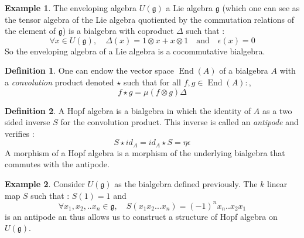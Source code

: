 \documentclass[11pt]{article}
\DeclareMathOperator{\End}{End}
\theoremstyle{definition}
\newtheorem{ex}{Example}[section]
\newtheorem{Def}{Definition}[section]
\begin{document}
\begin{ex} The enveloping algebra $U(\mathfrak{g})$  a Lie algebra $\mathfrak{g}$ (which one can see as the tensor algebra of the Lie algebra quotiented by the commutation relations of the element of $\mathfrak{g}$) is a bialgebra with coproduct $\Delta$ such that : $$\forall x\in U(\mathfrak{g}),\quad\Delta(x)=1\otimes x+ x\otimes 1\quad\mbox{and}\quad \epsilon(x)=0$$
So the enveloping algebra of a Lie algebra is a cocommutative bialgebra.
\end{ex}
\begin{Def} One can endow the vector space $\End(A)$ of a bialgebra $A$ with a \textit{convolution} product denoted $\star$ such that for all $f,g\in\End(A):$, $$f\star g=\mu(f\otimes g)\Delta $$
\end{Def}
\begin{Def} A Hopf algebra is a bialgebra in which the identity of $A$ as a two sided inverse $S$ for the convolution product. This inverse is called an \textit{antipode} and verifies : $$S\star id_A= id_A\star S=\eta\epsilon$$
A morphism of a Hopf algebra is a morphism of the underlying bialgebra that commutes with the antipode.
\end{Def}
\begin{ex}
Consider $U(\mathfrak{g})$ as the bialgebra defined previously. The $k$ linear map $S$ such that : $S(1)=1$ and $$\forall x_1,x_2,..x_n\in\mathfrak{g},\quad S(x_1x_2...x_n)=(-1)^nx_n..x_2x_1$$ is an antipode an thus allows us to construct a structure of Hopf algebra on $U(\mathfrak{g})$.
\end{ex}
\end{document}
